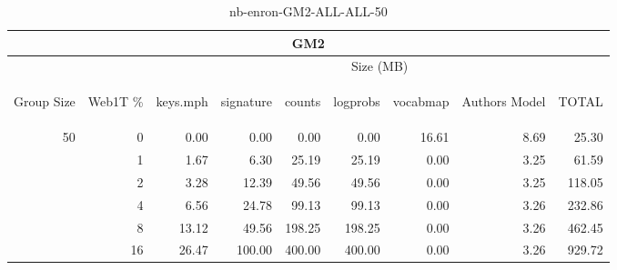 \begin{center}
\begin{table}[htbp] 
 \begin{center}
\begin{tabular}{ | r | r | r | r | r | r | r | r | r |}
\hline
\multicolumn{9}{|c|}{GM2}\\
\hline
 & & \multicolumn{7}{|c|}{Size (MB)}\\ \cline{3-9}
\begin{sideways}Group Size\end{sideways} & \begin{sideways}Web1T \% \end{sideways} & \begin{sideways}keys.mph\end{sideways} & \begin{sideways}signature\end{sideways} & \begin{sideways}counts\end{sideways} & \begin{sideways}logprobs\end{sideways} & \begin{sideways}vocabmap\end{sideways} & \begin{sideways}Authors Model \end{sideways} & \begin{sideways}TOTAL\end{sideways}\\
\hline
\multirow{5}{*}{50}
 & 0 & 0.00 & 0.00 & 0.00 & 0.00 & 16.61 & 8.69 & 25.30\\ \cline{2-9}
 & 1 & 1.67 & 6.30 & 25.19 & 25.19 & 0.00 & 3.25 & 61.59\\ \cline{2-9}
 & 2 & 3.28 & 12.39 & 49.56 & 49.56 & 0.00 & 3.25 & 118.05\\ \cline{2-9}
 & 4 & 6.56 & 24.78 & 99.13 & 99.13 & 0.00 & 3.26 & 232.86\\ \cline{2-9}
 & 8 & 13.12 & 49.56 & 198.25 & 198.25 & 0.00 & 3.26 & 462.45\\ \cline{2-9}
 & 16 & 26.47 & 100.00 & 400.00 & 400.00 & 0.00 & 3.26 & 929.72\\ \cline{2-9}
\hline
\end{tabular}
\caption{nb-enron-GM2-ALL-ALL-50}
\label{table:nb-enron-GM2-ALL-ALL-50}
\end{center}
 \end{table}
\end{center}

